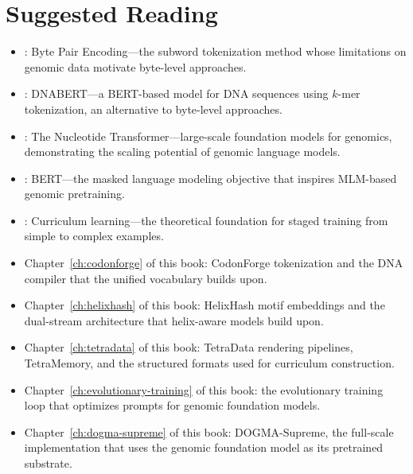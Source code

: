 \section*{Suggested Reading}
\begin{itemize}[leftmargin=1.5em]
  \item \citet{sennrich2016}: Byte Pair Encoding---the subword tokenization method whose limitations on genomic data motivate byte-level approaches.
  \item \citet{ji2021}: DNABERT---a BERT-based model for DNA sequences using $k$-mer tokenization, an alternative to byte-level approaches.
  \item \citet{dalla2023}: The Nucleotide Transformer---large-scale foundation models for genomics, demonstrating the scaling potential of genomic language models.
  \item \citet{devlin2019}: BERT---the masked language modeling objective that inspires MLM-based genomic pretraining.
  \item \citet{bengio2009}: Curriculum learning---the theoretical foundation for staged training from simple to complex examples.
  \item Chapter~\ref{ch:codonforge} of this book: CodonForge tokenization and the DNA compiler that the unified vocabulary builds upon.
  \item Chapter~\ref{ch:helixhash} of this book: HelixHash motif embeddings and the dual-stream architecture that helix-aware models build upon.
  \item Chapter~\ref{ch:tetradata} of this book: TetraData rendering pipelines, TetraMemory, and the structured formats used for curriculum construction.
  \item Chapter~\ref{ch:evolutionary-training} of this book: the evolutionary training loop that optimizes prompts for genomic foundation models.
  \item Chapter~\ref{ch:dogma-supreme} of this book: DOGMA-Supreme, the full-scale implementation that uses the genomic foundation model as its pretrained substrate.
\end{itemize}

